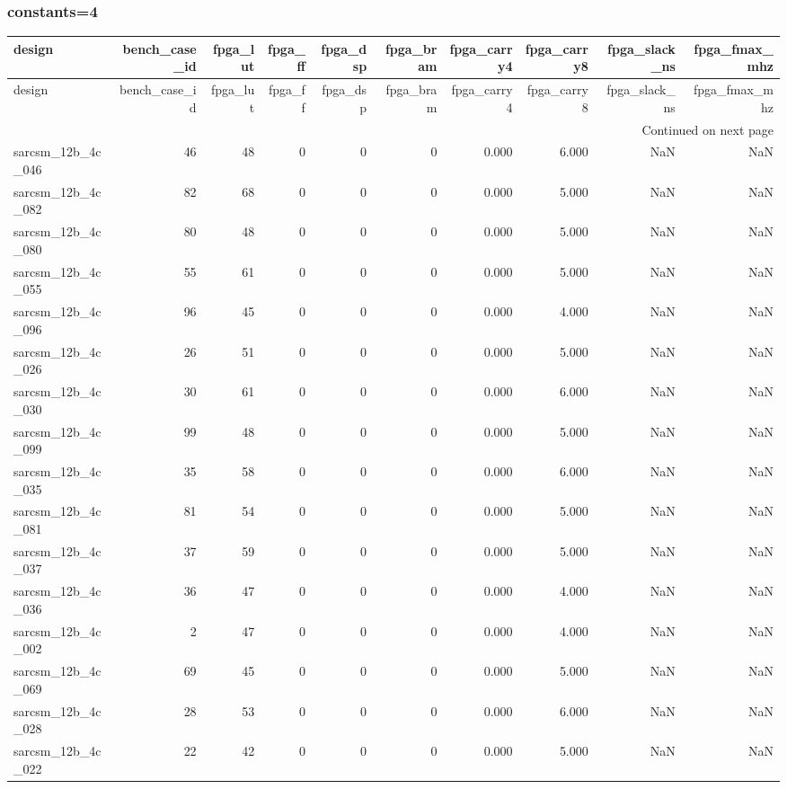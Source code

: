 \documentclass{article}
\begin{document}
\subsubsection*{constants=4}
\begin{longtable}{lrrrrrrrrr}
\toprule
design & bench\_case\_id & fpga\_lut & fpga\_ff & fpga\_dsp & fpga\_bram & fpga\_carry4 & fpga\_carry8 & fpga\_slack\_ns & fpga\_fmax\_mhz \\
\midrule
\endfirsthead
\toprule
design & bench\_case\_id & fpga\_lut & fpga\_ff & fpga\_dsp & fpga\_bram & fpga\_carry4 & fpga\_carry8 & fpga\_slack\_ns & fpga\_fmax\_mhz \\
\midrule
\endhead
\midrule
\multicolumn{10}{r}{Continued on next page} \\
\midrule
\endfoot
\bottomrule
\endlastfoot
sarcsm\_12b\_4c\_046 & 46 & 48 & 0 & 0 & 0 & 0.000 & 6.000 & NaN & NaN \\
sarcsm\_12b\_4c\_082 & 82 & 68 & 0 & 0 & 0 & 0.000 & 5.000 & NaN & NaN \\
sarcsm\_12b\_4c\_080 & 80 & 48 & 0 & 0 & 0 & 0.000 & 5.000 & NaN & NaN \\
sarcsm\_12b\_4c\_055 & 55 & 61 & 0 & 0 & 0 & 0.000 & 5.000 & NaN & NaN \\
sarcsm\_12b\_4c\_096 & 96 & 45 & 0 & 0 & 0 & 0.000 & 4.000 & NaN & NaN \\
sarcsm\_12b\_4c\_026 & 26 & 51 & 0 & 0 & 0 & 0.000 & 5.000 & NaN & NaN \\
sarcsm\_12b\_4c\_030 & 30 & 61 & 0 & 0 & 0 & 0.000 & 6.000 & NaN & NaN \\
sarcsm\_12b\_4c\_099 & 99 & 48 & 0 & 0 & 0 & 0.000 & 5.000 & NaN & NaN \\
sarcsm\_12b\_4c\_035 & 35 & 58 & 0 & 0 & 0 & 0.000 & 6.000 & NaN & NaN \\
sarcsm\_12b\_4c\_081 & 81 & 54 & 0 & 0 & 0 & 0.000 & 5.000 & NaN & NaN \\
sarcsm\_12b\_4c\_037 & 37 & 59 & 0 & 0 & 0 & 0.000 & 5.000 & NaN & NaN \\
sarcsm\_12b\_4c\_036 & 36 & 47 & 0 & 0 & 0 & 0.000 & 4.000 & NaN & NaN \\
sarcsm\_12b\_4c\_002 & 2 & 47 & 0 & 0 & 0 & 0.000 & 4.000 & NaN & NaN \\
sarcsm\_12b\_4c\_069 & 69 & 45 & 0 & 0 & 0 & 0.000 & 5.000 & NaN & NaN \\
sarcsm\_12b\_4c\_028 & 28 & 53 & 0 & 0 & 0 & 0.000 & 6.000 & NaN & NaN \\
sarcsm\_12b\_4c\_022 & 22 & 42 & 0 & 0 & 0 & 0.000 & 5.000 & NaN & NaN \\

\end{longtable}
\end{document}
